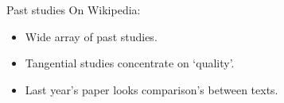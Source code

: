 \documentclass[t]{beamer}
\begin{document}
\begin{frame}{Past studies}
  On Wikipedia:
  \begin{itemize}[<+->]
  \item Wide array of past studies.
  \item Tangential studies concentrate on `quality'.
  \item Last year's paper looks comparison's between texts.
  \end{itemize} 


\end{frame}
\end{document}
